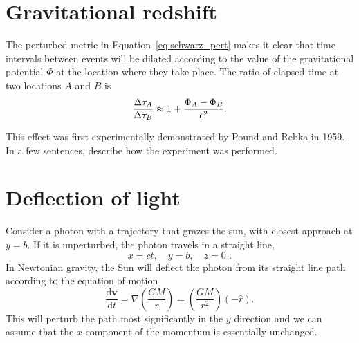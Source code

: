 \documentclass[12pt]{article}
\newcommand\diff{\mathrm{d}}
\begin{document}
\section{Gravitational redshift}

The perturbed metric in Equation~\ref{eq:schwarz_pert} makes it clear that time
intervals between events will be dilated according to the value of the
gravitational potential $\Phi$ at the location where they take place. The ratio
of elapsed time at two locations $A$ and $B$ is
\begin{equation}
    \frac{\Delta \tau_A}{\Delta \tau_B} \approx 1 + \frac{\Phi_A - \Phi_B}{c^2} \text.
\end{equation}

This effect was first experimentally demonstrated by Pound and Rebka in 1959. In
a few sentences, describe how the experiment was performed.

\section{Deflection of light}

Consider a photon with a trajectory that grazes the sun, with closest approach
at $y = b$. If it is unperturbed, the photon travels in a straight line,
\begin{equation}
    x = ct, \quad y = b, \quad z = 0 \text{ .}
\end{equation}
In Newtonian gravity, the Sun will deflect the photon from its straight line
path according to the equation of motion
\begin{equation}
    \frac{\diff\mathbf{v}}{\diff t} = \nabla\left(\frac{GM}{r}\right)
    = \left(\frac{GM}{r^2}\right) \left(- \hat{r}\right) \text{.}
\end{equation}
This will perturb the path most significantly in the $y$ direction and we can
assume that the $x$ component of the momentum is essentially unchanged.
\end{document}
